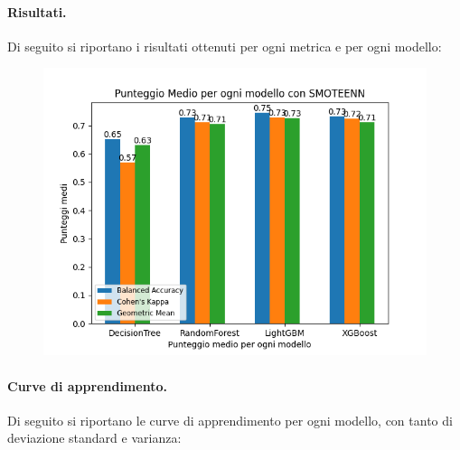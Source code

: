 \paragraph{Risultati.} Di seguito si riportano i risultati ottenuti per ogni metrica e per ogni modello:

\begin{figure}[H]
    \centering
    \includegraphics[scale=0.7]{img/smoteen_metrics.png}
\end{figure}



\paragraph{Curve di apprendimento.} Di seguito si riportano le curve di apprendimento per ogni modello, con tanto di deviazione standard e varianza:

